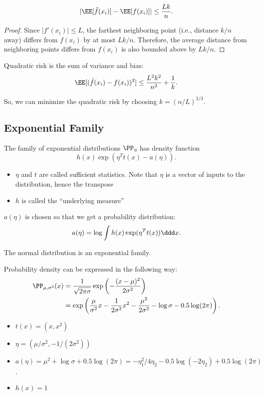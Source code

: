 \begin{theorem}

\[\vert \EE[\hat{f}(x_i)]-\EE[f(x_i)]\vert \leq \frac{Lk}{n}.\]
\end{theorem}

\begin{proof}
Since $\vert f'(x_i)\vert\leq L$, the farthest neighboring point (i.e., distance $k/n$ away) differs from $f(x_i)$ by at most $Lk/n$. Therefore, the average distance from neighboring points differs from $f(x_i)$ is also bounded above by $Lk/n$.
\end{proof}

\begin{theorem}

Quadratic risk is the sum of variance and bias:
\[\EE[(\hat{f}(x_i)-f(x_i))^2]\leq \frac{L^2k^2}{n^2}+\frac{1}{k}.\]
\end{theorem}

So, we can minimize the quadratic risk by choosing $k=(n/L)^{2/3}$. 

\subsection{Exponential Family}

The family of exponential distributions $\PP_{\eta}$ has density function 
\[h(x)\exp(\eta^Tt(x) - a(\eta)).\]

\begin{itemize}
    \item $\eta$ and $t$ are called sufficient statistics. Note that $\eta$ is a vector of inputs to the distribution, hence the transpose
    \item $h$ is called the ``underlying measure''
\end{itemize}

$a(\eta)$ is chosen so that we get a probability distribution: 
\[a(\eta) = \log \int h(x)\exp(\eta^Tt(x))\ddd x.\]

\begin{example}
\exlabel

The normal distribution is an exponential family. 
\end{example}
Probability density can be expressed in the following way: 
\begin{align*}
    \PP_{\mu, \sigma^2}(x) &= \frac{1}{\sqrt{2\pi \sigma}}\exp\left(-\frac{(x-\mu)^2}{2\sigma^2}\right) \\
    &= \exp\left(\frac{\mu}{\sigma^2}x - \frac{1}{2\sigma^2}x^2 - \frac{\mu^2}{2\sigma^2}-\log \sigma -0.5\log(2\pi)\right).
\end{align*}
\begin{itemize}
    \item $t(x) = (x,x^2)$
    \item $\eta = (\mu/\sigma^2, -1/(2\sigma^2))$
    \item $a(\eta) = \mu^2 + \log \sigma + 0.5\log(2\pi) = -\eta_1^2/4\eta_2-0.5\log(-2\eta_2)+0.5\log(2\pi)$. 
    \item $h(x) = 1$
\end{itemize}

